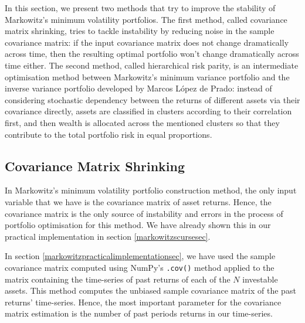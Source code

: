 
In this section, we present two methods that try to improve the stability of Markowitz's minimum volatility portfolios. The first method, called covariance matrix shrinking, tries to tackle instability by reducing noise in the sample covariance matrix: if the input covariance matrix does not change dramatically across time, then the resulting optimal portfolio won't change dramatically across time either. The second method, called hierarchical risk parity, is an intermediate optimisation method between Markowitz's minimum variance portfolio and the inverse variance portfolio developed by Marcos López de Prado: instead of considering stochastic dependency between the returns of different assets via their covariance directly, assets are classified in clusters according to their correlation first, and then wealth is allocated across the mentioned clusters so that they contribute to the total portfolio risk in equal proportions.

\subsection{Covariance Matrix Shrinking}
	
	In Markowitz's minimum volatility portfolio construction method, the only input variable that we have is the covariance matrix of asset returns. Hence, the covariance matrix is the only source of instability and errors in the process of portfolio optimisation for this method. We have already shown this in our practical implementation in section \ref{markowitzscursesec}.
	
	In section \ref{markowitzpracticalimplementationsec}, we have used the sample covariance matrix computed using NumPy's \texttt{.cov()} method applied to the matrix containing the time-series of past returns of each of the $N$ investable assets. This method computes the unbiased sample covariance matrix of the past returns' time-series. Hence, the most important parameter for the covariance matrix estimation is the number of past periods returns in our time-series.
	
